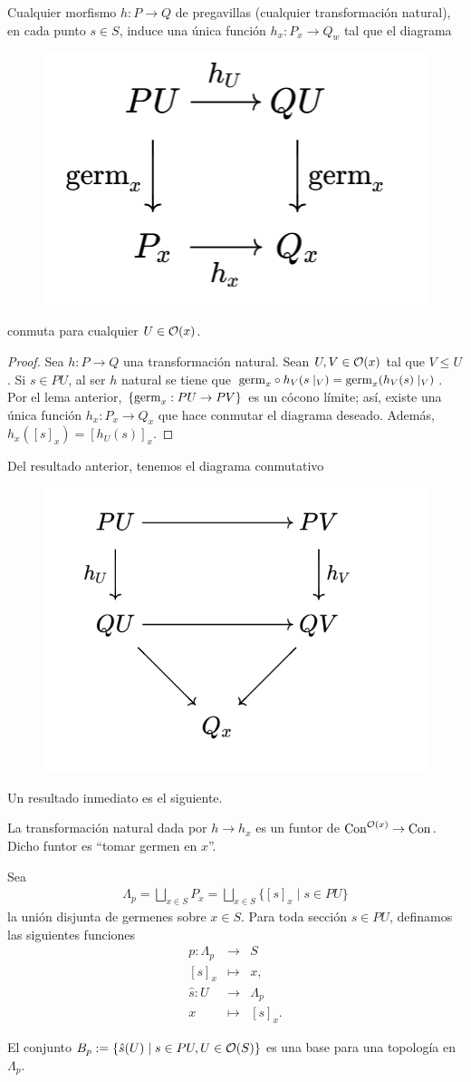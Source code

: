 \begin{lema}
    Cualquier morfismo $h:P\to Q$ de pregavillas (cualquier transformación natural), en cada punto $s\in S$, induce una única función $h_x:P_x\to Q_w$ tal que el diagrama 
    \begin{figure}[H]
        \centering
        \includegraphics[width=0.3\linewidth]{img/diagram2.3.3.png}
    \end{figure}
    conmuta para cualquier $U\in{\mathcal O}(x)$.
\end{lema}
\begin{proof}
    Sea $h:P\to Q$ una transformación natural. Sean $U,V\in{\mathcal O}(x)$ tal que $V\leq U$. Si $s\in PU$, al ser $h$ natural se tiene que ${\mathrm{germ}}_x\circ h_V(s\mid_V)={\mathrm{germ}}_x(h_V(s)\mid_V)$. Por el lema anterior, $\{{\mathrm{germ}}_x:PU\to PV\}$ es un cócono límite; así, existe una única función $h_x:P_x\to Q_x$ que hace conmutar el diagrama deseado. Además, $h_x([s]_x)=[h_U(s)]_x$. 
\end{proof}
\noindent
Del resultado anterior, tenemos el diagrama conmutativo
    \begin{figure}[H]
        \centering
        \includegraphics[width=0.37\linewidth]{img/diagram2.3.4.png}
    \end{figure}
\noindent
Un resultado inmediato es el siguiente.
\begin{lema}
    La transformación natural dada por $h\to h_x$ es un funtor de ${\mathrm{Con}}^{{\mathcal O}(x)}\to {\mathrm{Con}}$. Dicho funtor es ``tomar germen en $x$''.
\end{lema}
Sea 
\begin{eqnarray*}
\Lambda_p=\bigsqcup_{x\in S}P_x=\bigsqcup_{x\in S}\{[s]_x\mid s\in PU\}
\end{eqnarray*} 
la unión disjunta de germenes sobre $x\in S$. Para toda sección $s\in PU$, definamos las siguientes funciones
\begin{eqnarray*}
    p:\Lambda_p&\to& S\\
    \left[s\right]_x&\mapsto& x,\\
    \hat{s}:U&\to&\Lambda_p\\
    x&\mapsto& \left[s\right]_x.
\end{eqnarray*}
\begin{lema}
    El conjunto $B_p:=\{\hat{s}(U)\mid s\in PU, U\in{\mathcal O}(S)\}$ es una base para una topología en $\Lambda_p$.
\end{lema}

